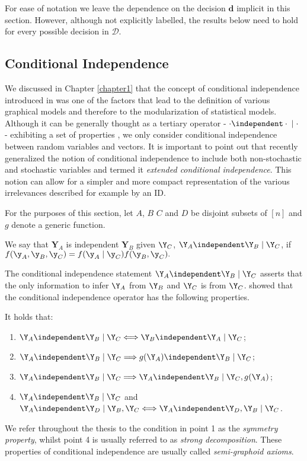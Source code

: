 For ease of notation we leave the dependence on the decision $\bm{d}$ implicit in this section. However, although not explicitly labelled, the results below need to hold for every possible decision in $\bm{\mathcal{D}}$.
 
\subsection{Conditional Independence}
\label{sec:condind}
We discussed in Chapter \ref{chapter1} that the concept of conditional independence introduced in \citet{Dawid1979} was one of the factors that lead to the definition of various graphical models and therefore to the modularization of statistical models. Although it can be generally thought as a tertiary operator - $\cdot \independent \cdot \;|\; \cdot$ - exhibiting a set of properties \citep[see e.g.][]{Dawid1993, Smith1989}, we only consider conditional independence between random variables and vectors. It is important to point out that recently \citet{Dawid2014} generalized the notion of conditional independence to include both non-stochastic and stochastic variables and termed it \textit{extended conditional independence}. This notion can allow for a simpler and more compact representation of the various irrelevances described for example by an \gls{ID}. 

For the purposes of this section, let $A$, $B$ $C$ and $D$ be disjoint subsets of $[n]$ and   $g$ denote a generic function.

\begin{definition}
We say that $\bm{Y}_A$ is independent $\bm{Y}_B$ given $\Y_C$, $\Y_A\independent \Y_B \;|\; \Y_C$, if 
$
f(\y_A,\y_B,\y_C)=f(\y_A\;|\;\y_C)f(\y_B,\y_C).
$
\end{definition}
 The conditional independence statement $\Y_A\independent \Y_B \;|\; \Y_C$ asserts that the only information to infer $\Y_A$ from $\Y_B$ and $\Y_C$ is from $\Y_C$.  \citet{Dawid1979} showed that the conditional independence operator has the following properties.
\begin{proposition}
\label{prop:semigraph}
It holds that:
\begin{enumerate}
\item $\Y_A\independent \Y_B \;|\;\Y_C \Longleftrightarrow \Y_B\independent \Y_A \;|\;\Y_C $;
\item $\Y_A\independent \Y_B \;|\;\Y_C \Longrightarrow g(\Y_A)\independent \Y_B \;|\;\Y_C$;
\item $\Y_A\independent \Y_B \;|\;\Y_C \Longrightarrow \Y_A\independent \Y_B \;|\;\Y_C, g(\Y_A)$;
\item $\Y_A\independent \Y_B \;|\;\Y_C$ and $\Y_A\independent\Y_D\;|\;\Y_B,\Y_C \Longleftrightarrow \Y_A\independent\Y_D,\Y_B\;|\;\Y_C$.
\end{enumerate}
\end{proposition}
We refer throughout the thesis to the condition in point 1 as the \textit{symmetry property}, whilst point 4 is usually referred to as \textit{strong decomposition}. These properties of conditional independence are usually called \textit{semi-graphoid axioms}.

